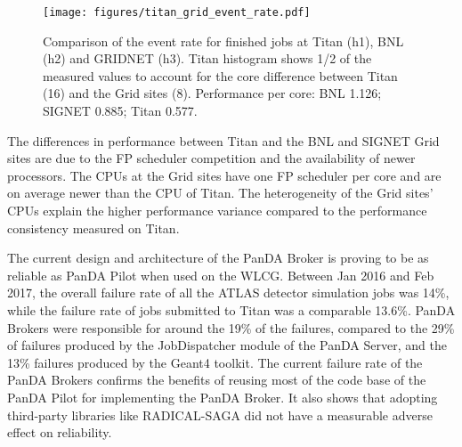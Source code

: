 \begin{figure}[htp]
    \texttt{[image: figures/titan\_grid\_event\_rate.pdf]}
    \caption{Comparison of the event rate for finished jobs at Titan (h1), BNL
    (h2) and GRIDNET (h3). Titan histogram shows 1/2 of the measured values to
    account for the core difference between Titan (16) and the Grid sites (8).
    Performance per core: BNL 1.126; SIGNET 0.885; Titan 0.577.}
\label{fig:comparison-titan-grid}
\end{figure}

The differences in performance between Titan and the BNL and SIGNET Grid sites
are due to the FP scheduler competition and the availability of newer
processors. The CPUs at the Grid sites have one FP scheduler per core and are on
average newer than the CPU of Titan. The heterogeneity of the Grid sites' CPUs
explain the higher performance variance compared to the performance consistency
measured on Titan.



The current design and architecture of the PanDA Broker is proving to be as
reliable as PanDA Pilot when used on the WLCG. Between Jan 2016 and Feb 2017,
the overall failure rate of all the ATLAS detector simulation jobs was 14\%,
while the failure rate of jobs submitted to Titan was a comparable 13.6\%. PanDA
Brokers were responsible for around the 19\% of the failures, compared to the
29\% of failures produced by the JobDispatcher module of the PanDA Server, and
the 13\% failures produced by the Geant4 toolkit. The current failure rate of
the PanDA Brokers confirms the benefits of reusing most of the code base of the
PanDA Pilot for implementing the PanDA Broker. It also shows that adopting
third-party libraries like RADICAL-SAGA did not have a measurable adverse effect
on reliability.


